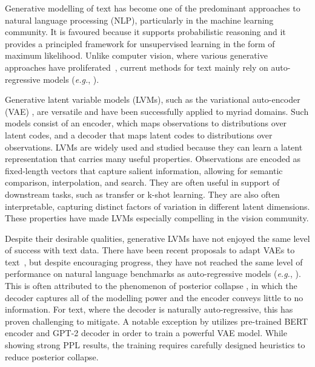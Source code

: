 \documentclass{article}
\newcommand{\eg}{{\em e.g.}}
\begin{document}
Generative modelling of text has become one of the predominant approaches to natural language processing (NLP), particularly in the machine learning community. 
It is favoured because it supports probabilistic reasoning and it provides a principled framework for unsupervised learning in the form of maximum likelihood. 
Unlike computer vision, where various generative approaches have proliferated~\cite{dinh2016density,goodfellow2014generative,Kingma2013,oord2016pixel,Rezende2014,vahdat2020NVAE}, 
current methods for text mainly rely on auto-regressive models (\eg, \citet{brown2020language}).

Generative latent variable models (LVMs), such as the variational auto-encoder 
(VAE) \cite{Kingma2013,Rezende2014}, are versatile and have been 
successfully applied to myriad domains.  
Such models consist of an encoder, which maps observations to distributions over 
latent codes, and a decoder that maps latent codes to distributions over observations.
LVMs are widely used and studied because they can learn a latent 
representation that carries many useful properties. 
Observations are encoded as fixed-length vectors that capture salient information, 
allowing for semantic comparison, interpolation, and search.
They are often useful in support of downstream tasks, such as transfer or k-shot learning. 
They are also often interpretable, capturing distinct factors of variation in different latent dimensions.
These properties have made LVMs especially compelling in the vision community.

Despite their desirable qualities, generative LVMs have not 
enjoyed the same level of success with text data. 
There have been recent proposals to adapt VAEs to text~\cite{DBLP:journals/corr/BowmanVVDJB15,  Guu2017GeneratingSB, KruengkraiACL2019,LiEtAlICNLG2019, DBLP:journals/corr/YangHSB17,bosc-vincent-2020-sequence}, 
but despite encouraging progress, they have not reached the same level of performance on natural 
language benchmarks as auto-regressive models
(\eg, \citep{DBLP:journals/corr/abs-1708-02182,DBLP:journals/corr/abs-1803-10049,pmlr-v97-wang19f}).
This is often attributed to the phenomenon of posterior collapse \citep{Fang_iLVM_2019_EMNLP,Li2019ASV},
in which the decoder captures all of the modelling power and the encoder conveys little to no information. 
For text, where the decoder is naturally auto-regressive, this has proven challenging to mitigate. 
A notable exception by \citet{li2020_Optimus} utilizes pre-trained BERT encoder
\citep{devlin-etal-2019-bert} and GPT-2 decoder \citep{Radford2019LanguageMA} in order to train a powerful VAE model. 
While showing strong PPL results, the training requires carefully designed heuristics to reduce posterior collapse.
\end{document}
